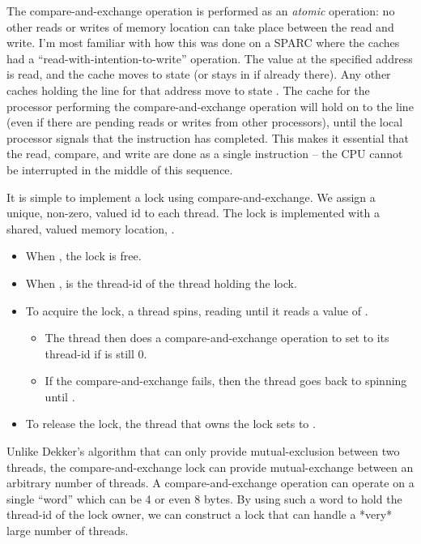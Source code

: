\documentclass{article}
\begin{document}
\begin{enumerate}
          The compare-and-exchange operation is performed as an \textit{atomic} operation:
          no other reads or writes of memory location \code{[\$dst]} can take place between
          the read and write.  I'm most familiar with how this was done on a SPARC where the
          caches had a ``read-with-intention-to-write'' operation.  The value at the specified
          address is read, and the cache moves to state  (or stays in  if already there).
          Any other caches holding the line for that address move to state .
          The cache for the processor performing the compare-and-exchange operation will hold
          on to the line (even if there are pending reads or writes from other processors),
          until the local processor signals that the instruction has completed.
          This makes it essential that the read, compare, and write are done as a single
          instruction -- the CPU cannot be interrupted in the middle of this sequence.

          It is simple to implement a lock using compare-and-exchange.
          We assign a unique, non-zero,  valued id to each thread.
          The lock is implemented with a shared,  valued memory location,
          .
          \begin{itemize}
              \item When , the lock is free.
              \item When ,  is the thread-id of
                    the thread holding the lock.
              \item To acquire the lock, a thread spins, reading 
                    until it reads a value of .
                    \begin{itemize}
                        \item The thread then does a compare-and-exchange operation
                              to set  to its thread-id if 
                              is still 0.
                        \item If the compare-and-exchange fails, then the thread goes
                              back to spinning until .
                    \end{itemize}
              \item To release the lock, the thread that owns the lock sets
                     to .
          \end{itemize}
          Unlike Dekker's algorithm that can only provide mutual-exclusion between two
          threads, the compare-and-exchange lock can provide mutual-exchange between
          an arbitrary number of threads.
          A compare-and-exchange operation can operate on a single ``word'' which can
          be 4 or even 8 bytes.  By using such a word to hold the thread-id of the lock
          owner, we can construct a lock that can handle a *very* large number of threads.


\end{enumerate}
\end{document}
